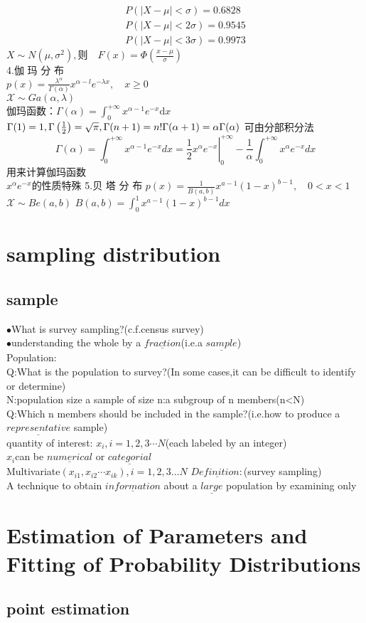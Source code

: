 \documentclass{report}
\begin{document}
$$
\begin{array}{l}{P(|X-\mu|<\sigma)=0.6828} \\ {P(|X-\mu|<2 \sigma)=0.9545} \\ {P(|X-\mu|<3 \sigma)=0.9973}\end{array}$$
$X \sim N\left(\mu, \sigma^{2}\right), 则 \quad F(x)=\Phi\left(\frac{x-\mu}{\sigma}\right)$\\
4.伽 玛 分 布\\
$p(x)=\frac{\lambda^{\alpha}}{\Gamma(\alpha)} x^{\alpha-l} e^{-\lambda x}, \quad x \geq 0$\\
$\mathcal{X} \sim G a(\alpha, \lambda)$\\
伽玛函数：$\Gamma(\alpha)=\int_{0}^{+\infty} x^{\alpha-1} e^{-x} \mathrm{d} x$ \\
$\Gamma(1)=1, \Gamma\left(\frac{1}{2}\right)=\sqrt{\pi},\Gamma(n+1)=n ! \\ \Gamma(\alpha+1)=\alpha \Gamma(\alpha)$
可由分部积分法$$\Gamma(\alpha)=\int_{0}^{+\infty} x^{\alpha-1} e^{-x} d x=\left.\frac{1}{2} x^{\alpha} e^{-x}\right|_{0} ^{+\infty}-\frac{1}{\alpha} \int_{0}^{+\infty} x^{\alpha} e^{-x} d x
$$
用来计算伽玛函数
\\$x^{\alpha} e^{-x}$的性质特殊
5.贝 塔 分 布
$p(x)=\frac{1}{B(a, b)} x^{a-1}(1-x)^{b-1}, \quad 0<x<1$
$\mathcal{X} \sim Be(a, b)$
$B(a, b)=\int_{0}^{1} x^{a-1}(1-x)^{b-1} d x$
\chapter{sampling distribution}
\section{sample}
\noindent$\bullet$What is survey sampling?(c.f.census survey)\\
$\bullet$understanding the whole by a $\underline{fraction}$(i.e.a $\underline{sample}$)
\\Population:\\
Q:What is the population to survey?(In some cases,it can be difficult to identify or determine)\\
N:population size
a sample of size n:a subgroup of n members(n<N)\\
Q:Which n members should be included in the sample?(i.e.how to produce a $\underline{representative}$ sample)\\
quantity of interest: 
$x_i,i=1,2,3\cdots N$(each labeled by an integer)\\
$x_i$can be $\underline{numerical}$ or $\underline{categorial}$
\\Multivariate$(x_{i1},x_{i2}\cdots x_{ik}),i=1,2,3 \dots N$
$\underline{Definition : }$(survey sampling)\\
A technique to obtain $\underline{information}$ about a $\underline{large}$ population by examining only
\chapter{Estimation of Parameters	and Fitting of Probability	Distributions}
\section{point estimation}
\end{document}
